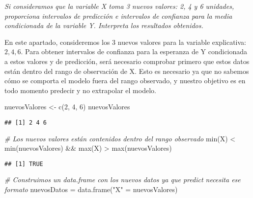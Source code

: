 \documentclass[
]{article}
\newenvironment{Shaded}{\begin{snugshade}}{\end{snugshade}}
\newcommand{\CommentTok}[1]{\textcolor[rgb]{0.56,0.35,0.01}{\textit{#1}}}
\newcommand{\DecValTok}[1]{\textcolor[rgb]{0.00,0.00,0.81}{#1}}
\newcommand{\FunctionTok}[1]{\textcolor[rgb]{0.00,0.00,0.00}{#1}}
\newcommand{\NormalTok}[1]{#1}
\newcommand{\OtherTok}[1]{\textcolor[rgb]{0.56,0.35,0.01}{#1}}
\newcommand{\SpecialCharTok}[1]{\textcolor[rgb]{0.00,0.00,0.00}{#1}}
\newcommand{\StringTok}[1]{\textcolor[rgb]{0.31,0.60,0.02}{#1}}
\begin{document}
\textit{Si consideramos que la variable X toma 3 nuevos valores: 2, 4 y 6 unidades, proporciona intervalos de predicción e intervalos de confianza para la media condicionada de la variable Y. Interpreta los resultados obtenidos.}

En este apartado, consideremos los 3 nuevos valores para la variable
explicativa: \({2, 4, 6}\). Para obtener intervalos de confianza para la
esperanza de Y condicionada a estos valores y de predicción, será
necesario comprobar primero que estos datos están dentro del rango de
observación de X. Esto es necesario ya que no sabemos cómo se comporta
el modelo fuera del rango observado, y nuestro objetivo es en todo
momento predecir y no extrapolar el modelo.

\begin{Shaded}
\begin{Highlighting}[]
\NormalTok{nuevosValores }\OtherTok{\textless{}{-}} \FunctionTok{c}\NormalTok{(}\DecValTok{2}\NormalTok{, }\DecValTok{4}\NormalTok{, }\DecValTok{6}\NormalTok{)}
\NormalTok{nuevosValores}
\end{Highlighting}
\end{Shaded}

\begin{verbatim}
## [1] 2 4 6
\end{verbatim}

\begin{Shaded}
\begin{Highlighting}[]
\CommentTok{\# Los nuevos valores están contenidos dentro del rango observado}
\FunctionTok{min}\NormalTok{(X) }\SpecialCharTok{\textless{}} \FunctionTok{min}\NormalTok{(nuevosValores) }\SpecialCharTok{\&\&} \FunctionTok{max}\NormalTok{(X) }\SpecialCharTok{\textgreater{}} \FunctionTok{max}\NormalTok{(nuevosValores)}
\end{Highlighting}
\end{Shaded}

\begin{verbatim}
## [1] TRUE
\end{verbatim}

\begin{Shaded}
\begin{Highlighting}[]
\CommentTok{\# Construimos un data.frame  con los nuevos datos ya que predict necesita ese formato}
\NormalTok{nuevosDatos }\OtherTok{=} \FunctionTok{data.frame}\NormalTok{(}\StringTok{"X"} \OtherTok{=}\NormalTok{ nuevosValores)}
\end{Highlighting}
\end{Shaded}
\end{document}
